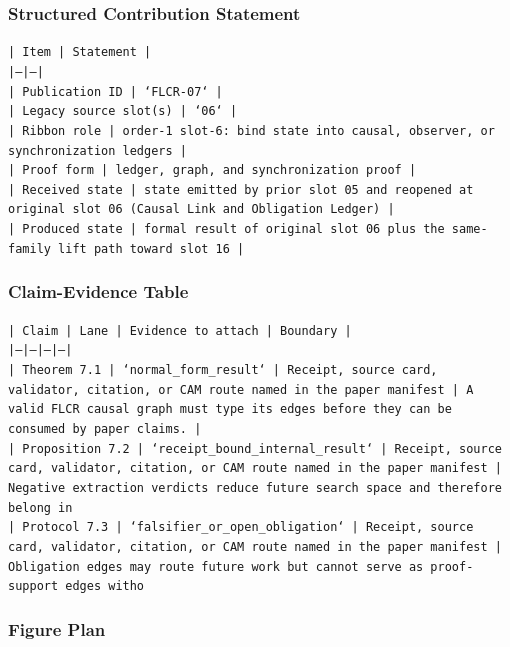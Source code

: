 \documentclass[11pt]{article}
\begin{document}
\subsubsection*{Structured Contribution Statement}

\noindent\texttt{| Item | Statement |}\\
\noindent\texttt{|---|---|}\\
\noindent\texttt{| Publication ID | `FLCR-07` |}\\
\noindent\texttt{| Legacy source slot(s) | `06` |}\\
\noindent\texttt{| Ribbon role | order-1 slot-6: bind state into causal, observer, or synchronization ledgers |}\\
\noindent\texttt{| Proof form | ledger, graph, and synchronization proof |}\\
\noindent\texttt{| Received state | state emitted by prior slot 05 and reopened at original slot 06 (Causal Link and Obligation Ledger) |}\\
\noindent\texttt{| Produced state | formal result of original slot 06 plus the same-family lift path toward slot 16 |}\\

\subsubsection*{Claim-Evidence Table}

\noindent\texttt{| Claim | Lane | Evidence to attach | Boundary |}\\
\noindent\texttt{|---|---|---|---|}\\
\noindent\texttt{| Theorem 7.1 | `normal\_form\_result` | Receipt, source card, validator, citation, or CAM route named in the paper manifest | A valid FLCR causal graph must type its edges before they can be consumed by paper claims. |}\\
\noindent\texttt{| Proposition 7.2 | `receipt\_bound\_internal\_result` | Receipt, source card, validator, citation, or CAM route named in the paper manifest | Negative extraction verdicts reduce future search space and therefore belong in }\\
\noindent\texttt{| Protocol 7.3 | `falsifier\_or\_open\_obligation` | Receipt, source card, validator, citation, or CAM route named in the paper manifest | Obligation edges may route future work but cannot serve as proof-support edges witho}\\

\subsubsection*{Figure Plan}
\end{document}
